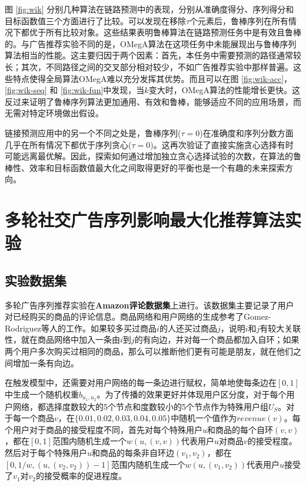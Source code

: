 图 \ref{fig:wik} 分别几种算法在链路预测中的表现，分别从准确度得分、序列得分和目标函数值三个方面进行了比较。可以发现在移除$\tau$个元素后，鲁棒序列在所有情况下都优于所有比较对象。这些结果表明鲁棒算法在链路预测任务中是有效且鲁棒的。与广告推荐实验不同的是，OMegA算法在这项任务中未能展现出与鲁棒序列算法相当的性能。这主要归因于两个因素：首先，本任务中需要预测的路径通常较长；其次，不同路径之间的交叉部分相对较少，不如广告推荐实验中那样普遍。这些特点使得全局算法OMegA难以充分发挥其优势。而且可以在图 \ref{fig:wik-acc}，\ref{fig:wik-seq} 和 \ref{fig:wik-fun}中发现，当$k$变大时，OMegA算法的性能增长更快。这反过来证明了鲁棒序列算法更加通用、有效和鲁棒，能够适应不同的应用场景，而无需对特定环境做出假设。

链接预测应用中的另一个不同之处是，鲁棒序列($\tau=0$)在准确度和序列分数方面几乎在所有情况下都优于序列贪心($\tau=0$)。这再次验证了直接实施贪心选择有时可能远离最优解。因此，探索如何通过增加独立贪心选择试验的次数，在算法的鲁棒性、效率和目标函数值最大化之间取得更好的平衡也是一个有趣的未来探索方向。



\section{多轮社交广告序列影响最大化推荐算法实验}
\label{sec:5_2}

\subsection{实验数据集}

多轮广告序列推荐实验在{\bfseries Amazon评论数据集}\cite{amazon24}上进行。该数据集主要记录了用户对已经购买的商品的评论信息。商品网络和用户网络的生成参考了Gomez-Rodriguez等人\cite{netgen}的工作。如果较多买过商品$i$的人还买过商品$j$，说明$i$和$j$有较大关联性，就在商品网络中加入一条由$i$到$j$的有向边，并对每一个商品都加入自环；如果两个用户多次购买过相同的商品，那么可以推断他们更有可能是朋友，就在他们之间增加一条有向边。

在触发模型中，还需要对用户网络的每一条边进行赋权，简单地使每条边在$[0,1]$中生成一个随机权重$b_{u_1,u_2}$。为了传播的效果更好并体现用户区分度，对于每个用户网络，都选择度数较大的5个节点和度数较小的5个节点作为特殊用户组$U_S$。对于每一个商品$v$，在$\{0.01,0.02,0.03,0.04,0.05\}$中随机一个值作为$revenue(v)$。每个用户对于商品的接受程度不同，首先对每个特殊用户$u$和商品的每个自环$(v,v)$，都在$[0,1]$范围内随机生成一个$w(u,(v,v))$代表用户$u$对商品$v$的接受程度。然后对于每个特殊用户$u$和商品的每条非自环边$(v_1,v_2)$，都在$[0,1/w,(u,(v_2,v_2))-1]$范围内随机生成一个$w(u,(v_1,v_2))$代表用户$u$接受了$v_1$对$v_2$的接受概率的促进程度。

